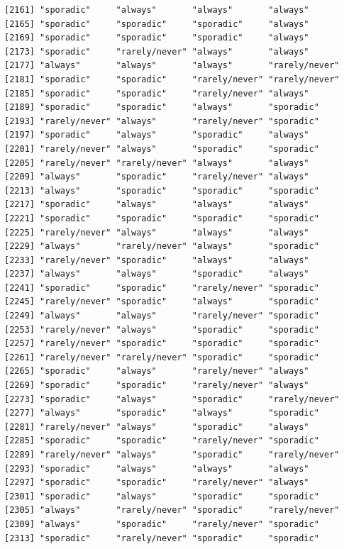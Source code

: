 \documentclass[
  letterpaper,
  DIV=11,
  numbers=noendperiod]{scrartcl}
\begin{document}
\begin{verbatim}
[2161] "sporadic"     "always"       "always"       "always"      
[2165] "sporadic"     "sporadic"     "sporadic"     "always"      
[2169] "sporadic"     "sporadic"     "sporadic"     "always"      
[2173] "sporadic"     "rarely/never" "always"       "always"      
[2177] "always"       "always"       "always"       "rarely/never"
[2181] "sporadic"     "sporadic"     "rarely/never" "rarely/never"
[2185] "sporadic"     "sporadic"     "rarely/never" "always"      
[2189] "sporadic"     "sporadic"     "always"       "sporadic"    
[2193] "rarely/never" "always"       "rarely/never" "sporadic"    
[2197] "sporadic"     "always"       "sporadic"     "always"      
[2201] "rarely/never" "always"       "sporadic"     "sporadic"    
[2205] "rarely/never" "rarely/never" "always"       "always"      
[2209] "always"       "sporadic"     "rarely/never" "always"      
[2213] "always"       "sporadic"     "sporadic"     "sporadic"    
[2217] "sporadic"     "always"       "always"       "always"      
[2221] "sporadic"     "sporadic"     "sporadic"     "sporadic"    
[2225] "rarely/never" "always"       "always"       "always"      
[2229] "always"       "rarely/never" "always"       "sporadic"    
[2233] "rarely/never" "sporadic"     "always"       "always"      
[2237] "always"       "always"       "sporadic"     "always"      
[2241] "sporadic"     "sporadic"     "rarely/never" "sporadic"    
[2245] "rarely/never" "sporadic"     "always"       "sporadic"    
[2249] "always"       "always"       "rarely/never" "sporadic"    
[2253] "rarely/never" "always"       "sporadic"     "sporadic"    
[2257] "rarely/never" "sporadic"     "sporadic"     "sporadic"    
[2261] "rarely/never" "rarely/never" "sporadic"     "sporadic"    
[2265] "sporadic"     "always"       "rarely/never" "always"      
[2269] "sporadic"     "sporadic"     "rarely/never" "always"      
[2273] "sporadic"     "always"       "sporadic"     "rarely/never"
[2277] "always"       "sporadic"     "always"       "sporadic"    
[2281] "rarely/never" "always"       "sporadic"     "always"      
[2285] "sporadic"     "sporadic"     "rarely/never" "sporadic"    
[2289] "rarely/never" "always"       "sporadic"     "rarely/never"
[2293] "sporadic"     "always"       "always"       "always"      
[2297] "sporadic"     "sporadic"     "rarely/never" "always"      
[2301] "sporadic"     "always"       "sporadic"     "sporadic"    
[2305] "always"       "rarely/never" "sporadic"     "rarely/never"
[2309] "always"       "sporadic"     "rarely/never" "sporadic"    
[2313] "sporadic"     "rarely/never" "sporadic"     "sporadic"    

\end{verbatim}
\end{document}
